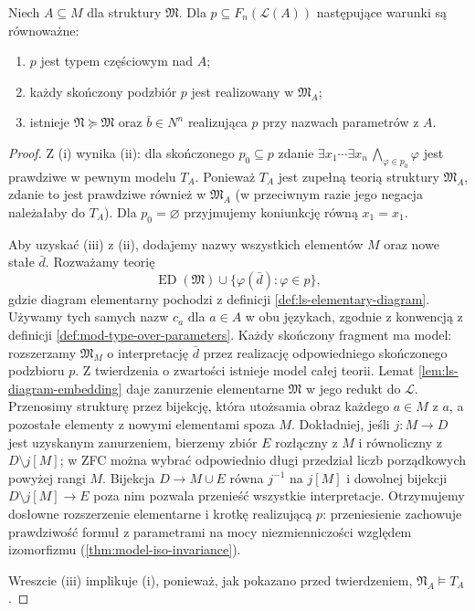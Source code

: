 \begin{twierdzenie}
\label{thm:mod-type-elementary-extension}
Niech $A\subseteq M$ dla struktury $\mathfrak M$.
Dla $p\subseteq F_n(\mathcal L(A))$ następujące warunki
są równoważne:
\begin{enumerate}[label=(\roman*)]
\item $p$ jest typem częściowym nad $A$;
\item każdy skończony podzbiór $p$ jest realizowany w $\mathfrak M_A$;
\item istnieje $\mathfrak N\succeq\mathfrak M$ oraz
$\bar b\in N^n$ realizująca $p$ przy nazwach parametrów z $A$.
\end{enumerate}
\end{twierdzenie}
\begin{proof}
Z (i) wynika (ii): dla skończonego $p_0\subseteq p$ zdanie
$\exists x_1\cdots\exists x_n\,\bigwedge_{\varphi\in p_0}\varphi$
jest prawdziwe w pewnym modelu $T_A$. Ponieważ $T_A$ jest
zupełną teorią struktury $\mathfrak M_A$, zdanie to jest prawdziwe
również w $\mathfrak M_A$ (w przeciwnym razie jego negacja
należałaby do $T_A$). Dla $p_0=\varnothing$ przyjmujemy
koniunkcję równą $x_1=x_1$.

Aby uzyskać (iii) z (ii), dodajemy nazwy wszystkich elementów
$M$ oraz nowe stałe $\bar d$. Rozważamy teorię
\[
\operatorname{ED}(\mathfrak M)\cup
\{\varphi(\bar d):\varphi\in p\},
\]
gdzie diagram elementarny pochodzi z definicji
\ref{def:ls-elementary-diagram}. Używamy tych samych nazw
$c_a$ dla $a\in A$ w obu językach, zgodnie z konwencją
z definicji \ref{def:mod-type-over-parameters}. Każdy skończony fragment ma model:
rozszerzamy $\mathfrak M_M$ o interpretację $\bar d$
przez realizację odpowiedniego skończonego podzbioru $p$.
Z twierdzenia o zwartości istnieje model całej teorii.
Lemat \ref{lem:ls-diagram-embedding} daje zanurzenie
elementarne $\mathfrak M$ w jego redukt do $\mathcal L$.
Przenosimy strukturę przez bijekcję, która utożsamia obraz
każdego $a\in M$ z $a$, a pozostałe elementy z nowymi elementami
spoza $M$. Dokładniej, jeśli $j:M\to D$ jest uzyskanym
zanurzeniem, bierzemy zbiór $E$ rozłączny z $M$ i równoliczny
z $D\setminus j[M]$; w ZFC można wybrać odpowiednio długi
przedział liczb porządkowych powyżej rangi $M$.
Bijekcja $D\to M\cup E$ równa $j^{-1}$ na $j[M]$
i dowolnej bijekcji $D\setminus j[M]\to E$ poza nim
pozwala przenieść wszystkie interpretacje. Otrzymujemy dosłowne rozszerzenie elementarne
i krotkę realizującą $p$: przeniesienie zachowuje prawdziwość
formuł z parametrami na mocy niezmienniczości względem
izomorfizmu (\ref{thm:model-iso-invariance}).

Wreszcie (iii) implikuje (i), ponieważ, jak pokazano
przed twierdzeniem, $\mathfrak N_A\models T_A$.
\end{proof}

